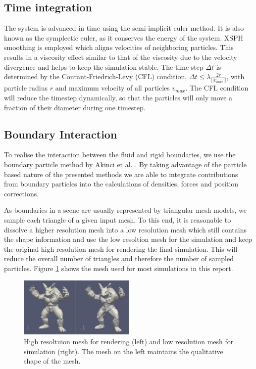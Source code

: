 \documentclass[11pt, letterpaper, twocolumn]{article}
\begin{document}
\subsection{Time integration}
The system is advanced in time using the semi-implicit euler method. It is also known as the symplectic euler, as it conserves the energy of the system. XSPH smoothing is employed which aligns velocities of neighboring particles. This results in a viscosity effect similar to that of the viscosity due to the velocity divergence and helps to keep the simulation stable. The time step \(\Delta t\) is determined by the Courant-Friedrich-Levy (CFL) condition, \( \Delta t \leq \lambda \frac{2r}{||v_{max}||}\), with particle radius \(r\) and maximum velocity of all particles \(v_{max}\). The CFL condition will reduce the timestep dynamically, so that the particles will only move a fraction of their diameter during one timestep. 

\subsection{Boundary Interaction}
To realise the interaction between the fluid and rigid boundaries, we use the boundary particle method by Akinci et al. \cite{akinci2012}. By taking advantage of the particle based nature of the presented methods we are able to integrate contributions from boundary particles into the calculations of densities, forces and position corrections.

As boundaries in a scene are usually represented by triangular mesh models, we sample each triangle of a given input mesh. To this end, it is reasonable to dissolve a higher resolution mesh into a low resolution mesh which still contains the shape information and use the low resoltion mesh for the simulation and keep the original high resolution mesh for rendering the final simulation. This will reduce the overall number of triangles and therefore the number of sampled particles. Figure \ref{fig:mesh} shows the mesh used for most simulations in this report.

\begin{figure}[ht]
    \centering
    \includegraphics[width=0.5\textwidth]{images/mesh.png}
    \caption{High resoltuion mesh for rendering (left) and low resolution mesh for simulation (right). The mesh on the left maintains the qualitative shape of the mesh.}
    \label{fig:mesh}
\end{figure}
\end{document}
